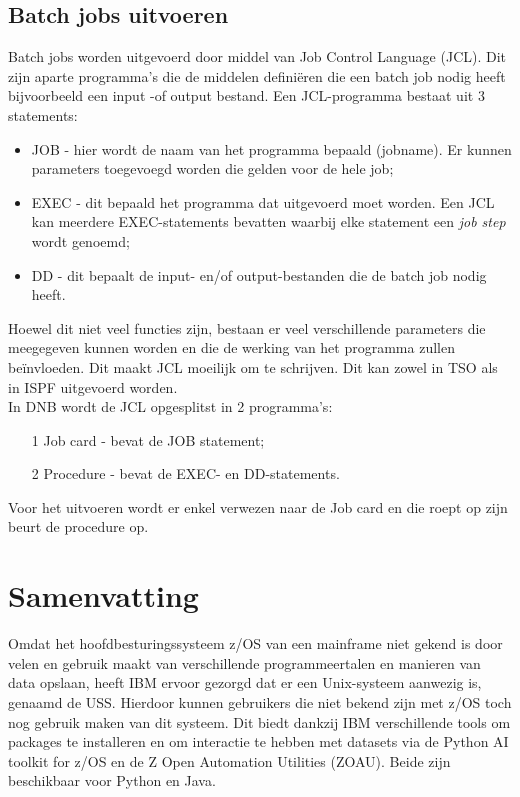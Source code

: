\subsection{Batch jobs uitvoeren}
Batch jobs worden uitgevoerd door middel van Job Control Language (JCL). Dit zijn aparte programma's die de middelen definiëren die een batch job nodig heeft bijvoorbeeld een input -of output bestand. Een JCL-programma bestaat uit 3 statements: 
\begin{itemize}
    \item JOB - hier wordt de naam van het programma bepaald (jobname). Er kunnen parameters toegevoegd worden die gelden voor de hele job;
    \item EXEC - dit bepaald het programma dat uitgevoerd moet worden. Een JCL kan meerdere EXEC-statements bevatten waarbij elke statement een \textit{job step} wordt genoemd;
    \item DD - dit bepaalt de input- en/of output-bestanden die de batch job nodig heeft.
\end{itemize}
Hoewel dit niet veel functies zijn, bestaan er veel verschillende parameters die meegegeven kunnen worden en die de werking  van het programma zullen beïnvloeden. Dit maakt JCL moeilijk om te schrijven. Dit kan zowel in TSO als in ISPF uitgevoerd worden. \autocite{IBM} \\

In DNB wordt de JCL opgesplitst in 2 programma's:

\begin{itemize}
    \item[1] Job card - bevat de JOB statement;
    \item[2] Procedure - bevat de EXEC- en DD-statements.
\end{itemize}
Voor het uitvoeren wordt er enkel verwezen naar de Job card en die roept op zijn beurt de procedure op. \\

\newpage
\section{Samenvatting}
Omdat het hoofdbesturingssysteem z/OS van een mainframe niet gekend is door velen en gebruik maakt van verschillende programmeertalen en manieren van data opslaan, heeft IBM ervoor gezorgd dat er een Unix-systeem aanwezig is, genaamd de USS. Hierdoor kunnen gebruikers die niet bekend zijn met z/OS toch nog gebruik maken van dit systeem. Dit biedt dankzij IBM verschillende tools om packages te installeren en om interactie te hebben met datasets via de Python AI toolkit for z/OS en de Z Open Automation Utilities (ZOAU). Beide zijn beschikbaar voor Python en Java. \\

